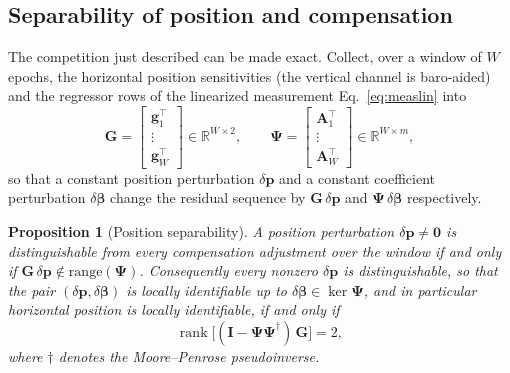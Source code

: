 \documentclass{IEEEtaes}
\newtheorem{proposition}{Proposition}
\begin{document}
\subsection{Separability of position and compensation}\label{sec:obs}
The competition just described can be made exact. Collect, over a window of $W$
epochs, the horizontal position sensitivities (the vertical channel is
baro-aided) and the regressor rows of the linearized measurement
Eq.~\eqref{eq:measlin} into
\begin{equation}
\mathbf{G}=\begin{bmatrix}\mathbf{g}_1^{\top}\\ \vdots\\ \mathbf{g}_W^{\top}\end{bmatrix}
\in\mathbb{R}^{W\times2},
\qquad
\boldsymbol{\Psi}=\begin{bmatrix}\mathbf{A}_1^{\top}\\ \vdots\\ \mathbf{A}_W^{\top}\end{bmatrix}
\in\mathbb{R}^{W\times m},
\label{eq:gpsi}
\end{equation}
so that a constant position perturbation $\delta\mathbf{p}$ and a constant
coefficient perturbation $\delta\boldsymbol{\beta}$ change the residual
sequence by $\mathbf{G}\,\delta\mathbf{p}$ and
$\boldsymbol{\Psi}\,\delta\boldsymbol{\beta}$ respectively.

\begin{proposition}[Position separability]\label{prop:obs}
A position perturbation $\delta\mathbf{p}\neq\mathbf{0}$ is distinguishable
from every compensation adjustment over the window if and only if
$\mathbf{G}\,\delta\mathbf{p}\notin\mathrm{range}(\boldsymbol{\Psi})$.
Consequently every nonzero $\delta\mathbf{p}$ is distinguishable, so that the
pair $(\delta\mathbf{p},\delta\boldsymbol{\beta})$ is locally identifiable up
to $\delta\boldsymbol{\beta}\in\ker\boldsymbol{\Psi}$, and in particular
horizontal position is locally identifiable, if and only if
\begin{equation}
\operatorname{rank}\!\big[(\mathbf{I}-\boldsymbol{\Psi}\boldsymbol{\Psi}^{\dagger})\,\mathbf{G}\big]=2,
\label{eq:projrank}
\end{equation}
where $\dagger$ denotes the Moore--Penrose pseudoinverse.
\end{proposition}
\end{document}
